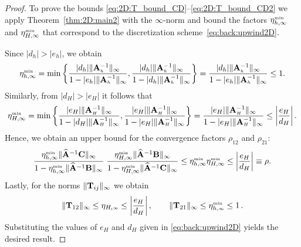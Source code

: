 \begin{proof}
%
To prove the bounds \eqref{eq:2D:T_bound_CD}--\eqref{eq:2D:T_bound_CD2}
we apply Theorem~\ref{thm:2D:main2} with the $\infty$-norm and bound the
factors $\eta_{h,\infty}^{\scriptscriptstyle \min}$ and $\eta_{H,\infty}^{\scriptscriptstyle \min}$
that correspond to the discretization scheme~\eqref{eq:back:upwind2D}.

Since $|d_{h}|>|e_{h}|$, we obtain
%
\[
  \eta_{h,\infty}^{\scriptscriptstyle \min} = \min \left\{ \frac{|d_h| \|\mathbf{A}_{\scriptscriptstyle h}^{-1}\|_{\infty}}
  {1-|e_h|\|\mathbf{A}_{\scriptscriptstyle h}^{-1}\|_{\infty}},  \frac{|d_h|\|\mathbf{A}_{\scriptscriptstyle h}^{-1}\|_{\infty}}
  {1-|d_h|\|\mathbf{A}_{\scriptscriptstyle h}^{-1}\|_{\infty}} \right\} =  \frac{|d_h|\|\mathbf{A}_{\scriptscriptstyle h}^{-1}\|_{\infty}}
  {1-|e_h|\|\mathbf{A}_{\scriptscriptstyle h}^{-1}\|_{\infty}} \leq 1.
\]
%
Similarly, from $|d_{H}|>|e_{H}|$ it follows that
%
\[
\eta_{H,\infty}^{\scriptscriptstyle \min}
= \min \left\{\frac{|e_H|\|\mathbf{A}_{\scriptscriptstyle H}^{-1}\|_{\infty}}{1-|d_H| \|\mathbf{A}_{\scriptscriptstyle H}^{-1}\|_{\infty}},
\frac{|e_H|\|\mathbf{A}_{\scriptscriptstyle H}^{-1}\|_{\infty} }{1-|e_H|\|\mathbf{A}_{\scriptscriptstyle H}^{-1}\|_{\infty}}\right\}
= \frac{|e_H|\|\mathbf{A}_{\scriptscriptstyle H}^{-1}\|_{\infty} }{1-|e_H|\|\mathbf{A}_{\scriptscriptstyle H}^{-1}\|_{\infty}}
\leq \left|\frac{e_H}{d_H}\right|.
\]
%
Hence, we obtain an upper bound for the convergence factors $\rho_{12}$ and $\rho_{21}$:
%
\begin{equation*}
\frac{\eta_{h,\infty}^{\scriptscriptstyle \min} \|\widehat{\mathbf{A}}^{-1}\mathbf{C}\|_{\infty}}{1-\eta_{h,\infty}^{\scriptscriptstyle \min}
\|\widehat{\mathbf{A}}^{-1}\mathbf{B}\|_{\infty}}\;
\frac{\eta_{H,\infty}^{\scriptscriptstyle \min}\|\widehat{\mathbf{A}}^{-1}\mathbf{B}\|_{\infty}}{1-
\eta_{H,\infty}^{\scriptscriptstyle \min}\|\widehat{\mathbf{A}}^{-1}\mathbf{C}\|_{\infty}}
\leq \eta_{h,\infty}^{\scriptscriptstyle \min}\eta_{H,\infty}^{\scriptscriptstyle \min} \leq \left|\frac{e_H}{d_H}\right|\equiv \rho.
\end{equation*}
%
Lastly, for the norms $\| \mathbf{T}_{ij} \|_{\infty}$ we obtain
%
\[
	\| \mathbf{T}_{12} \|_{\infty} \leq
	\eta_{H,\scriptscriptstyle \infty} \leq
	\left|\frac{e_H}{d_H}\right|,\qquad
	\| \mathbf{T}_{21} \|_{\infty} \leq \eta_{h,\scriptscriptstyle \infty}^{\scriptscriptstyle \min} \leq 1\,.
\]
Substituting the values of $e_H$ and $d_H$ given in \eqref{eq:back:upwind2D}
yields the desired result.
\end{proof}

